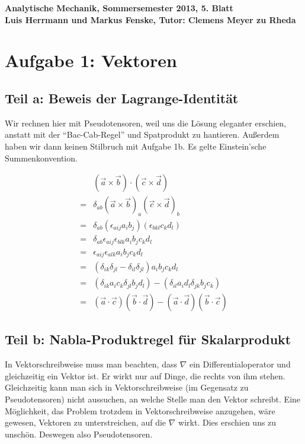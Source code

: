 \documentclass[a4paper,german,12pt,smallheadings]{scrartcl}
\begin{document}
\begin{center}
\bfseries %
\sffamily %
\vspace{-40pt}
Analytische Mechanik, Sommersemester 2013, 5. Blatt \\
Luis Herrmann und Markus Fenske, Tutor: Clemens Meyer zu Rheda
\vspace{-10pt}
\end{center}
\section*{Aufgabe 1: Vektoren}
\subsection*{Teil a: Beweis der Lagrange-Identität}

Wir rechnen hier mit Pseudotensoren, weil uns die Lösung eleganter
erschien, anstatt mit der ``Bac-Cab-Regel'' und Spatprodukt zu hantieren.
Außerdem haben wir dann keinen Stilbruch mit Aufgabe 1b. Es gelte Einstein'sche
Summenkonvention.

\begin{align*}
  &(\vec{a} \times \vec{b}) \cdot (\vec{c} \times \vec{d})\\
  =&\delta_{ab}(\vec{a} \times \vec{b})_a (\vec{c} \times \vec{d})_b\\
  =&\delta_{ab}(\epsilon_{aij} a_i b_j) (\epsilon_{bkl}c_k d_l)\\
  =&\delta_{ab}\epsilon_{aij}\epsilon_{blk} a_i b_jc_kd_l\\
  =&\epsilon_{aij}\epsilon_{alk} a_i b_jc_kd_l\\
  =&(\delta_{ik}\delta_{jl}-\delta_{il}\delta_{jl}) a_i b_j c_k d_l\\
  =&(\delta_{ik}a_ic_k \delta_{jl}b_jd_l)-(\delta_{il}a_id_l\delta_{jk}b_jc_k)\\
  =&(\vec{a} \cdot \vec{c})(\vec{b} \cdot \vec{d})-(\vec{a}\cdot\vec{d})(\vec{b} \cdot \vec{c})
\end{align*}

\subsection*{Teil b: Nabla-Produktregel für Skalarprodukt}

In Vektorschreibweise muss man beachten, dass $\nabla$ ein Differentialoperator
und gleichzeitig ein Vektor ist. Er wirkt nur auf Dinge, die rechts von ihm
stehen. Gleichzeitig kann man sich in Vektorschreibweise (im Gegensatz zu
Pseudotensoren) nicht aussuchen, an welche Stelle man den Vektor schreibt. Eine
Möglichkeit, das Problem trotzdem in Vektorschreibweise anzugehen, wäre
gewesen, Vektoren zu unterstreichen, auf die $\nabla$ wirkt. Dies erschien uns
zu unschön. Deswegen also Pseudotensoren.
\end{document}
